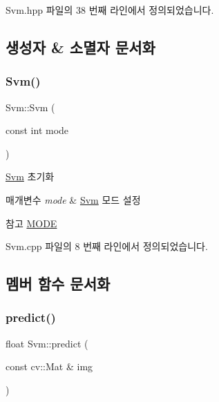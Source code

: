 Svm.\+hpp 파일의 38 번째 라인에서 정의되었습니다.



\subsection{생성자 \& 소멸자 문서화}
\mbox{\label{class_svm_a762af972a037686ea80d9896905f57ed}} 
\subsubsection{\texorpdfstring{Svm()}{Svm()}}
{\footnotesize\ttfamily Svm\+::\+Svm (\begin{DoxyParamCaption}\item[{const int}]{mode }\end{DoxyParamCaption})}



\hyperlink{class_svm}{Svm} 초기화 


\begin{DoxyParams}{매개변수}
{\em mode} & \hyperlink{class_svm}{Svm} 모드 설정 \\
\hline
\end{DoxyParams}
\begin{DoxySeeAlso}{참고}
\hyperlink{class_svm_a479f12db422de0a4c4d46900ee154928}{M\+O\+DE} 
\end{DoxySeeAlso}


Svm.\+cpp 파일의 8 번째 라인에서 정의되었습니다.



\subsection{멤버 함수 문서화}
\mbox{\label{class_svm_ad157df6a49f7380a99232e5b8fa6b63e}} 
\subsubsection{\texorpdfstring{predict()}{predict()}}
{\footnotesize\ttfamily float Svm\+::predict (\begin{DoxyParamCaption}\item[{const cv\+::\+Mat \&}]{img }\end{DoxyParamCaption})}



